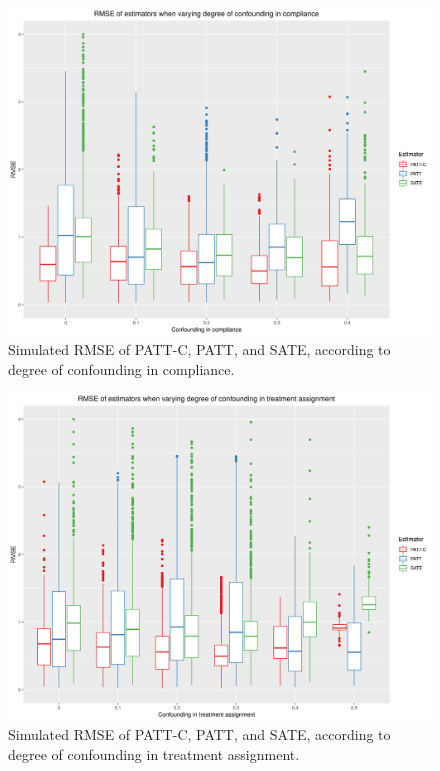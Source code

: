 \documentclass[hidelinks,12pt]{article}
\begin{document}
{\begin{appendices}
\begin{figure}[htbp]
	\begin{center}
		\includegraphics[width = 1\textwidth]{rmse_boxplots_RateConC}
		\caption{Simulated RMSE of PATT-C, PATT, and SATE, according to degree of confounding in compliance.\label{fig:rmse_boxplots_RateConC}}
	\end{center}
\end{figure}

\begin{figure}[htbp]
	\begin{center}
		\includegraphics[width = 1\textwidth]{rmse_boxplots_RateConT}
		\caption{Simulated RMSE of PATT-C, PATT, and SATE, according to degree of confounding in treatment assignment.\label{fig:rmse_boxplots_RateConT}}
	\end{center}
\end{figure}


\end{appendices}}
\end{document}
